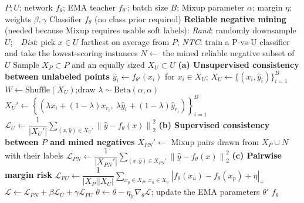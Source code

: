 \documentclass{article}
\begin{document}
\begin{algorithm}[!h]
\renewcommand{\algorithmicrequire}{\textbf{Input:}} %
\renewcommand{\algorithmicensure}{\textbf{Output:}} %
	\caption{MixPUL (supervised and unsupervised consistency by Mixup)} %
	\begin{algorithmic}[1] %
	    \REQUIRE
	    $P;U$; network $f_{\theta}$; EMA teacher $f_{\theta'}$; batch size $B$;
	    Mixup parameter $\alpha$; margin $\eta$; weights $\beta,\gamma$
	    \ENSURE
	    Classifier $f_{\theta}$ (no class prior required)
	    \STATE \textbf{Reliable negative mining} (needed because Mixup requires usable soft labels):
	    \STATE \quad \emph{Rand}: randomly downsample $U$;\ \ \emph{Dist}: pick $x\in U$ farthest on average from $P$;
	    \emph{NTC}: train a P-vs-U classifier and take the lowest-scoring instances %
	    \STATE $N\leftarrow$ the mined reliable negative subset of $U$
	    \STATE Sample $X_{P}\subset P$ and an equally sized $X_{U}\subset U$
	    \STATE \textbf{(a) Unsupervised consistency between unlabeled points}
	    \STATE \quad $\hat{y}_{i}\leftarrow f_{\theta'}(x_{i})$ for $x_{i}\in X_{U}$;\quad
	    $X_{U}\leftarrow \{(x_{i},\hat{y}_{i})\}_{i=1}^{B}$ %
	    \STATE \quad $W\leftarrow \mathrm{Shuffle}(X_{U})$;\quad draw $\lambda\sim \mathrm{Beta}(\alpha,\alpha)$
	    \STATE \quad $X_{U}'\leftarrow \left\{\left(\lambda x_{i}+(1-\lambda)x_{r_{i}},\ \lambda\hat{y}_{i}+(1-\lambda)\hat{y}_{r_{i}}\right)\right\}_{i=1}^{B}$ %
	    \STATE \quad $\mathcal{L}_{U}\leftarrow \dfrac{1}{|X_{U}'|}\sum_{(x,\hat{y})\in X_{U}'}\left\|\hat{y}-f_{\theta}(x)\right\|_{2}^{2}$
	    \STATE \textbf{(b) Supervised consistency between $P$ and mined negatives}
	    \STATE \quad $X_{PN}'\leftarrow$ Mixup pairs drawn from $X_{P}\cup N$ with their labels %
	    \STATE \quad $\mathcal{L}_{PN}\leftarrow \dfrac{1}{|X_{PN}'|}\sum_{(x,\hat{y})\in X_{PN}'}\left\|\hat{y}-f_{\theta}(x)\right\|_{2}^{2}$
	    \STATE \textbf{(c) Pairwise margin risk}
	    \STATE \quad $\mathcal{L}_{PU}\leftarrow \dfrac{1}{|X_{P}||X_{U}|}\sum_{x_{p}\in X_{P},\,x_{u}\in X_{U}}
	    \left|f_{\theta}(x_{u})-f_{\theta}(x_{p})+\eta\right|_{+}$ %
	    \STATE $\mathcal{L}\leftarrow \mathcal{L}_{PN}+\beta\mathcal{L}_{U}+\gamma\mathcal{L}_{PU}$
	    \STATE $\theta\leftarrow \theta-\eta_{\mathrm{lr}}\nabla_{\theta}\mathcal{L}$;\quad
	    update the EMA parameters $\theta'$
	    \ENDWHILE
		\RETURN $f_{\theta}$
	\end{algorithmic}
\end{algorithm}
\end{document}
